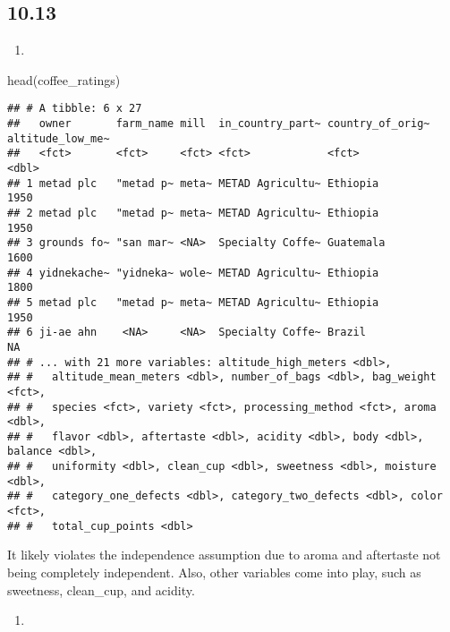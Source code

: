 \documentclass[
]{article}
\newenvironment{Shaded}{\begin{snugshade}}{\end{snugshade}}
\newcommand{\FunctionTok}[1]{\textcolor[rgb]{0.00,0.00,0.00}{#1}}
\newcommand{\NormalTok}[1]{#1}
\providecommand{\tightlist}{%
  \setlength{\itemsep}{0pt}\setlength{\parskip}{0pt}}
\begin{document}
\hypertarget{section-8}{%
\subsection{10.13}\label{section-8}}

\begin{enumerate}
\def\labelenumi{\alph{enumi}.}
\tightlist
\item
\end{enumerate}

\begin{Shaded}
\begin{Highlighting}[]
\FunctionTok{head}\NormalTok{(coffee\_ratings)}
\end{Highlighting}
\end{Shaded}

\begin{verbatim}
## # A tibble: 6 x 27
##   owner       farm_name mill  in_country_part~ country_of_orig~ altitude_low_me~
##   <fct>       <fct>     <fct> <fct>            <fct>                       <dbl>
## 1 metad plc   "metad p~ meta~ METAD Agricultu~ Ethiopia                     1950
## 2 metad plc   "metad p~ meta~ METAD Agricultu~ Ethiopia                     1950
## 3 grounds fo~ "san mar~ <NA>  Specialty Coffe~ Guatemala                    1600
## 4 yidnekache~ "yidneka~ wole~ METAD Agricultu~ Ethiopia                     1800
## 5 metad plc   "metad p~ meta~ METAD Agricultu~ Ethiopia                     1950
## 6 ji-ae ahn    <NA>     <NA>  Specialty Coffe~ Brazil                         NA
## # ... with 21 more variables: altitude_high_meters <dbl>,
## #   altitude_mean_meters <dbl>, number_of_bags <dbl>, bag_weight <fct>,
## #   species <fct>, variety <fct>, processing_method <fct>, aroma <dbl>,
## #   flavor <dbl>, aftertaste <dbl>, acidity <dbl>, body <dbl>, balance <dbl>,
## #   uniformity <dbl>, clean_cup <dbl>, sweetness <dbl>, moisture <dbl>,
## #   category_one_defects <dbl>, category_two_defects <dbl>, color <fct>,
## #   total_cup_points <dbl>
\end{verbatim}

It likely violates the independence assumption due to aroma and
aftertaste not being completely independent. Also, other variables come
into play, such as sweetness, clean\_cup, and acidity.

\begin{enumerate}
\def\labelenumi{\alph{enumi}.}
\setcounter{enumi}{1}
\tightlist
\item
\end{enumerate}
\end{document}
